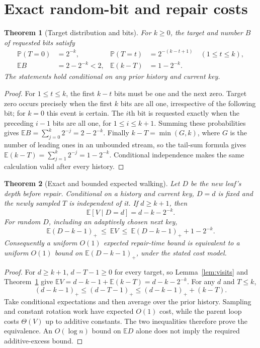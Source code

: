 \documentclass[11pt]{article}
\newtheorem{theorem}{Theorem}
\newcommand{\E}{\mathbb{E}}
\newcommand{\Prb}{\mathbb{P}}
\newcommand{\pos}[1]{\left(#1\right)_{+}}
\begin{document}
\section{Exact random-bit and repair costs}
\begin{theorem}[Target distribution and bits]\label{thm:bits}
For $k\geq0$, the target and number $B$ of requested bits satisfy
\begin{align*}
\Prb(T=0)&=2^{-k}, & \Prb(T=t)&=2^{-(k-t+1)}\quad(1\leq t\leq k),\\
\E B&=2-2^{-k}<2, & \E(k-T)&=1-2^{-k}.
\end{align*}
The statements hold conditional on any prior history and current key.
\end{theorem}
\begin{proof}
For $1\leq t\leq k$, the first $k-t$ bits must be one and the next zero.
Target zero occurs precisely when the first $k$ bits are all one, irrespective
of the following bit; for $k=0$ this event is certain. The $i$th bit is requested
exactly when the preceding $i-1$ bits are all one, for $1\leq i\leq k+1$.
Summing these probabilities gives $\E B=\sum_{j=0}^{k}2^{-j}=2-2^{-k}$.
Finally $k-T=\min(G,k)$, where $G$ is the number of leading ones in an
unbounded stream, so the tail-sum formula gives
$\E(k-T)=\sum_{j=1}^{k}2^{-j}=1-2^{-k}$. Conditional independence makes the
same calculation valid after every history.
\end{proof}

\begin{theorem}[Exact and bounded expected walking]\label{thm:walk}
Let $D$ be the new leaf's depth before repair. Conditional on a history and
current key, $D=d$ is fixed and the newly sampled $T$ is independent of it. If
$d\geq k+1$, then
\[\E[V\mid D=d]=d-k-2^{-k}.\]
For random $D$, including an adaptively chosen next key,
\[\E\pos{D-k-1}\ \leq\ \E V\ \leq\
\E\pos{D-k-1}+1-2^{-k}.\]
Consequently a uniform $O(1)$ expected repair-time bound is equivalent to a
uniform $O(1)$ bound on $\E\pos{D-k-1}$, under the stated cost model.
\end{theorem}
\begin{proof}
For $d\geq k+1$, $d-T-1\geq0$ for every target, so Lemma~\ref{lem:visits}
and Theorem~\ref{thm:bits} give
$\E V=d-k-1+\E(k-T)=d-k-2^{-k}$. For any $d$ and $T\leq k$,
\[\pos{d-k-1}\leq\pos{d-T-1}
\leq\pos{d-k-1}+(k-T).\]
Take conditional expectations and then average over the prior history. Sampling
and constant rotation work have expected $O(1)$ cost, while the parent loop
costs $\Theta(V)$ up to additive constants. The two inequalities therefore
prove the equivalence. An $O(\log n)$ bound on $\E D$ alone does not imply the
required additive-excess bound.
\end{proof}
\end{document}
